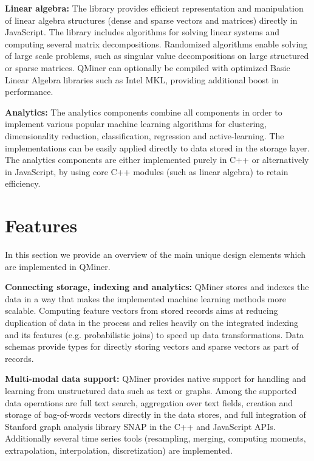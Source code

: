 \documentclass{article} %
\begin{document}
\textbf{Linear algebra:} The library provides efficient representation and manipulation of linear algebra structures (dense and sparse vectors and matrices) directly in JavaScript. The library includes algorithms for solving linear systems and computing several matrix decompositions. Randomized algorithms enable solving of large scale problems, such as singular value decompositions\cite{tropp} on large structured or sparse matrices. QMiner can optionally be compiled with optimized Basic Linear Algebra libraries such as Intel MKL, providing additional boost in performance. 

\textbf{Analytics:} The analytics components combine all components in order to implement various popular machine learning algorithms for clustering, dimensionality reduction, classification, regression and active-learning. The implementations can be easily applied directly to data stored in the storage layer. The analytics components are either implemented purely in C++ or alternatively in JavaScript, by using core C++ modules (such as linear algebra) to retain efficiency.


\section{Features}

In this section we provide an overview of the main unique design elements which are implemented in QMiner.

\textbf{Connecting storage, indexing and analytics:} QMiner stores and indexes the data in a way that makes the implemented machine learning methods more scalable. Computing feature vectors from stored records aims at reducing duplication of data in the process and relies heavily on the integrated indexing and its features (e.g. probabilistic joins) to speed up data transformations. Data schemas provide types for directly storing vectors and sparse vectors as part of records.

\textbf{Multi-modal data support:} QMiner provides native support for handling and learning from unstructured data such as text or graphs. Among the supported data operations are full text search, aggregation over text fields, creation and storage of bag-of-words vectors directly in the data stores, and full integration of Stanford graph analysis library SNAP \cite{snap} in the C++ and JavaScript APIs. Additionally several time series tools (resampling, merging, computing moments, extrapolation, interpolation, discretization) are implemented.
\end{document}
